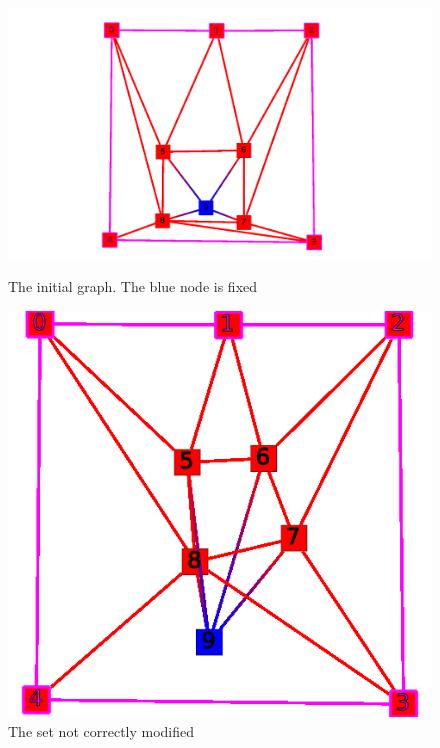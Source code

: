 \begin{figure}[!h]
  \begin{minipage}[!h]{.5\linewidth}
   \centering
   \includegraphics[scale=0.27]{snapshots/constate_fix_init.png}
   \caption{The initial graph. The blue node is fixed}
   \label{mauvais_1}
 \end{minipage} \hfill
 \begin{minipage}[!h]{.45\linewidth}
   \includegraphics[scale=0.45]{snapshots/constate_probleme.png}
   \caption{The set not correctly modified}
   \label{mauvais_2}
 \end{minipage}
\end{figure}

